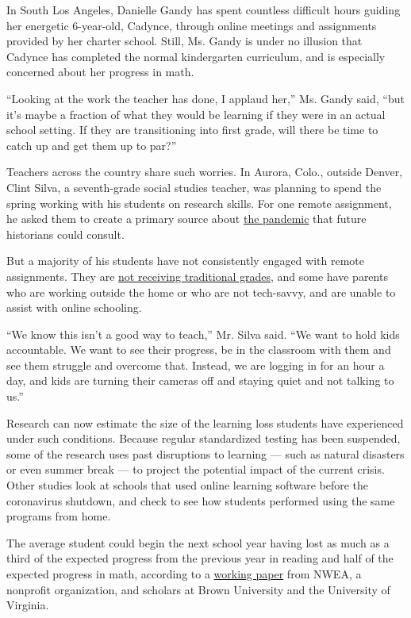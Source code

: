 In South Los Angeles, Danielle Gandy has spent countless difficult hours
guiding her energetic 6-year-old, Cadynce, through online meetings and
assignments provided by her charter school. Still, Ms. Gandy is under no
illusion that Cadynce has completed the normal kindergarten curriculum,
and is especially concerned about her progress in math.

``Looking at the work the teacher has done, I applaud her,'' Ms. Gandy
said, ``but it's maybe a fraction of what they would be learning if they
were in an actual school setting. If they are transitioning into first
grade, will there be time to catch up and get them up to par?''

Teachers across the country share such worries. In Aurora, Colo.,
outside Denver, Clint Silva, a seventh-grade social studies teacher, was
planning to spend the spring working with his students on research
skills. For one remote assignment, he asked them to create a primary
source about
\href{https://www.nytimes3xbfgragh.onion/news-event/coronavirus}{the
pandemic} that future historians could consult.

But a majority of his students have not consistently engaged with remote
assignments. They are
\href{https://www.nytimes3xbfgragh.onion/2020/04/30/us/coronavirus-high-school-grades.html}{not
receiving traditional grades}, and some have parents who are working
outside the home or who are not tech-savvy, and are unable to assist
with online schooling.

``We know this isn't a good way to teach,'' Mr. Silva said. ``We want to
hold kids accountable. We want to see their progress, be in the
classroom with them and see them struggle and overcome that. Instead, we
are logging in for an hour a day, and kids are turning their cameras off
and staying quiet and not talking to us.''

Research can now estimate the size of the learning loss students have
experienced under such conditions. Because regular standardized testing
has been suspended, some of the research uses past disruptions to
learning --- such as natural disasters or even summer break --- to
project the potential impact of the current crisis. Other studies look
at schools that used online learning software before the coronavirus
shutdown, and check to see how students performed using the same
programs from home.

The average student could begin the next school year having lost as much
as a third of the expected progress from the previous year in reading
and half of the expected progress in math, according to a
\href{https://www.edworkingpapers.com/ai20-226}{working paper} from
NWEA, a nonprofit organization, and scholars at Brown University and the
University of Virginia.

